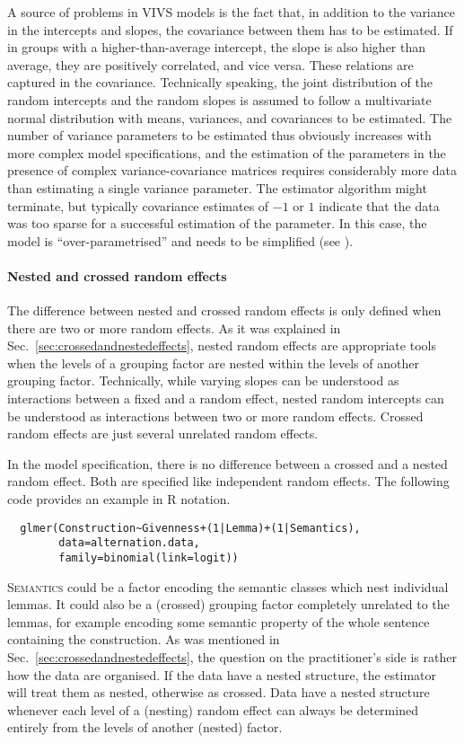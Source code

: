 A source of problems in VIVS models is the fact that, in addition to the variance in the intercepts and slopes, the covariance between them has to be estimated.
If in groups with a higher-than-average intercept, the slope is also higher than average, they are positively correlated, and vice versa.
These relations are captured in the covariance.
Technically speaking, the joint distribution of the random intercepts and the random slopes is assumed to follow a multivariate normal distribution with means, variances, and covariances to be estimated.
The number of variance parameters to be estimated thus obviously increases with more complex model specifications, and the estimation of the parameters in the presence of complex variance-covariance matrices requires considerably more data than estimating a single variance parameter.
The estimator algorithm might terminate, but typically covariance estimates of $-1$ or $1$ indicate that the data was too sparse for a successful estimation of the parameter.
In this case, the model is ``over-parametrised'' and needs to be simplified (see \citealt{BatesEa2015a,MatuschekEa2017}).

\paragraph{Nested and crossed random effects}

The difference between nested and crossed random effects is only defined when there are two or more random effects.
As it was explained in Sec.~\ref{sec:crossedandnestedeffects}, nested random effects are appropriate tools when the levels of a grouping factor are nested within the levels of another grouping factor.
Technically, while varying slopes can be understood as interactions between a fixed and a random effect, nested random intercepts can be understood as interactions between two or more random effects.
Crossed random effects are just several unrelated random effects.

In the model specification, there is no difference between a crossed and a nested random effect.
Both are specified like independent random effects.
The following code provides an example in R notation.

\begin{lstlisting}
  glmer(Construction~Givenness+(1|Lemma)+(1|Semantics),
        data=alternation.data,
        family=binomial(link=logit))
\end{lstlisting}

\textsc{Semantics} could be a factor encoding the semantic classes which nest individual lemmas.
It could also be a (crossed) grouping factor completely unrelated to the lemmas, for example encoding some semantic property of the whole sentence containing the construction.
As was mentioned in Sec.~\ref{sec:crossedandnestedeffects}, the question on the practitioner's side is rather how the data are organised.
If the data have a nested structure, the estimator will treat them as nested, otherwise as crossed.
Data have a nested structure whenever each level of a (nesting) random effect can always be determined entirely from the levels of another (nested) factor.



